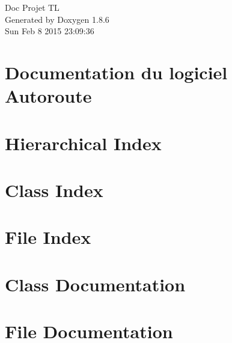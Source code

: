 \documentclass[twoside]{book}
\newcommand{\clearemptydoublepage}{%
  \newpage{\pagestyle{empty}\cleardoublepage}%
}
\begin{document}
\hypersetup{pageanchor=false}
\begin{titlepage}
\vspace*{7cm}
\begin{center}%
{\Large Doc Projet T\-L }\\
\vspace*{1cm}
{\large Generated by Doxygen 1.8.6}\\
\vspace*{0.5cm}
{\small Sun Feb 8 2015 23:09:36}\\
\end{center}
\end{titlepage}
\clearemptydoublepage
\tableofcontents
\clearemptydoublepage
{}
\hypersetup{pageanchor=true}

\chapter{Documentation du logiciel Autoroute}
\label{index}\hypertarget{index}{}
\chapter{Hierarchical Index}

\chapter{Class Index}

\chapter{File Index}

\chapter{Class Documentation}


























\chapter{File Documentation}



\newpage
{}
{}
\printindex
\end{document}
